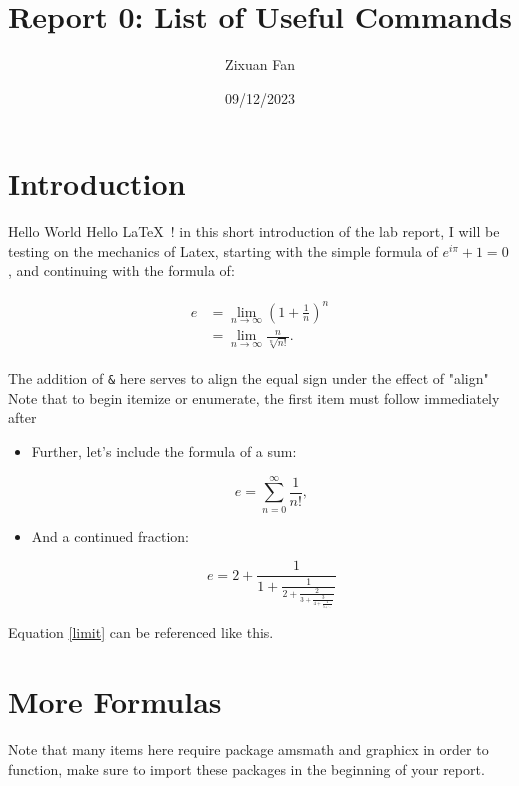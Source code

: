 \documentclass{article}
\title{Report 0: List of Useful Commands}
\author{Zixuan Fan}
\date{09/12/2023}
\begin{document}
\maketitle

\section{Introduction}


Hello World Hello \LaTeX\ ! in this short introduction of the lab report, I will be testing on the mechanics of Latex, starting with the simple formula of $e^{i\pi}+1=0$, and continuing with the formula of:

\begin{align}
\begin{split}
\label{limit}
e&=
\lim_{n\to\infty}
\left(	1+\frac{1}{n}	\right)^n \\
&=\lim_{n\to\infty}	\frac{n}{\sqrt[n]{n!}}.
\end{split}
\end{align}

\noindent The addition of \verb|&| here serves to align the equal sign under the effect of "align"\\

\noindent Note that to begin itemize or enumerate, the first item must follow immediately after

\begin{itemize}
\item Further, let's include the formula of a sum:

$$e=
\sum_{n=0}^{\infty}	\frac{1}{n!},
$$

\item And a continued fraction:

$$e=
2+\frac{1}{1+\frac{1}{2+\frac{2}{3+\frac{3}{4+\frac{4}{5+\ddots}}}}}
$$

\end{itemize}
Equation \ref{limit} can be referenced like this.

\section{More Formulas}

Note that many items here require package amsmath and graphicx in order to function, make sure to import these packages in the beginning of your report.
\end{document}
